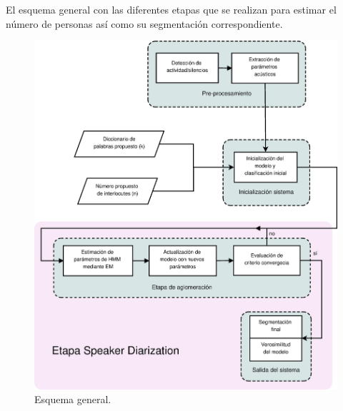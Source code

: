 El esquema general con las diferentes etapas que se realizan para estimar el número de personas así como su segmentación correspondiente.

\begin{figure}[bth]
  \centerline
  {\includegraphics[width=1.5\linewidth]{gfx/chap5/general_flow}} \quad
  \caption{Esquema general.}
  \label{fig:esquema}
\end{figure}